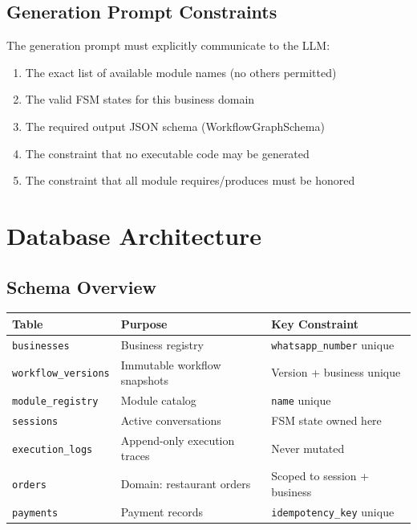 \documentclass[12pt, a4paper]{report}
\begin{document}
\section{Generation Prompt Constraints}

The generation prompt must explicitly communicate to the LLM:
\begin{enumerate}
  \item The exact list of available module names (no others permitted)
  \item The valid FSM states for this business domain
  \item The required output JSON schema (WorkflowGraphSchema)
  \item The constraint that no executable code may be generated
  \item The constraint that all module requires/produces must be honored
\end{enumerate}

\chapter{Database Architecture}

\section{Schema Overview}

\begin{longtable}{lll}
\toprule
\textbf{Table} & \textbf{Purpose} & \textbf{Key Constraint} \\
\midrule
\texttt{businesses} & Business registry & \texttt{whatsapp\_number} unique \\
\texttt{workflow\_versions} & Immutable workflow snapshots & Version + business unique \\
\texttt{module\_registry} & Module catalog & \texttt{name} unique \\
\texttt{sessions} & Active conversations & FSM state owned here \\
\texttt{execution\_logs} & Append-only execution traces & Never mutated \\
\texttt{orders} & Domain: restaurant orders & Scoped to session + business \\
\texttt{payments} & Payment records & \texttt{idempotency\_key} unique \\
\bottomrule
\end{longtable}
\end{document}
